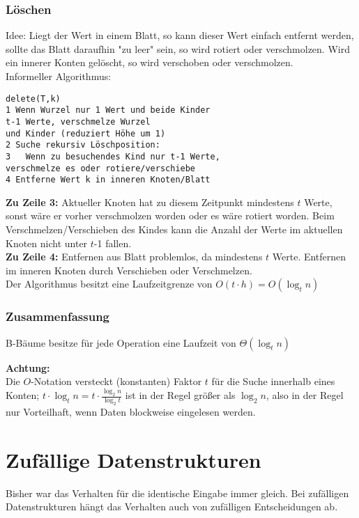 \documentclass[jou,apacite]{apa6}
\begin{document}
\subsubsection{Löschen}
Idee: Liegt der Wert in einem Blatt, so kann dieser Wert einfach entfernt werden, sollte das Blatt daraufhin "zu leer" sein, so wird rotiert oder verschmolzen. Wird ein innerer Konten gelöscht, so wird verschoben oder verschmolzen. \\
Informeller Algorithmus:
\begin{lstlisting}
delete(T,k)
1 Wenn Wurzel nur 1 Wert und beide Kinder
t-1 Werte, verschmelze Wurzel 
und Kinder (reduziert Höhe um 1)
2 Suche rekursiv Löschposition:
3   Wenn zu besuchendes Kind nur t-1 Werte,
verschmelze es oder rotiere/verschiebe
4 Entferne Wert k in inneren Knoten/Blatt
\end{lstlisting}
{\bfseries Zu Zeile 3:} Aktueller Knoten hat zu diesem Zeitpunkt mindestens $t$ Werte, sonst wäre
er vorher verschmolzen worden oder es wäre rotiert worden.
Beim Verschmelzen/Verschieben des Kindes kann die Anzahl der Werte
im aktuellen Knoten nicht unter $t$-1 fallen.\\
{\bfseries Zu Zeile 4:} Entfernen aus Blatt problemlos, da mindestens $t$ Werte.
Entfernen im inneren Knoten durch Verschieben oder Verschmelzen.\\
Der Algorithmus besitzt eine Laufzeitgrenze von $O(t \cdot h) = O(\log_t n)$

\subsubsection{Zusammenfassung}
B-Bäume besitze für jede Operation eine Laufzeit von $\Theta(\log_t n)$ 

{\bfseries Achtung:} \\
Die $O$-Notation versteckt (konstanten) Faktor $t$ für die Suche innerhalb eines Konten;
$t \cdot \log_t n = t \cdot \frac{\log_{2}n}{\log_{2}t} $ ist in der Regel größer als $\log_{2}n$, also in der Regel nur Vorteilhaft, wenn Daten blockweise eingelesen werden.

\section{Zufällige Datenstrukturen}
Bisher war das Verhalten für die identische Eingabe immer gleich. Bei zufälligen Datenstrukturen hängt das Verhalten auch von zufälligen Entscheidungen ab.
\end{document}

